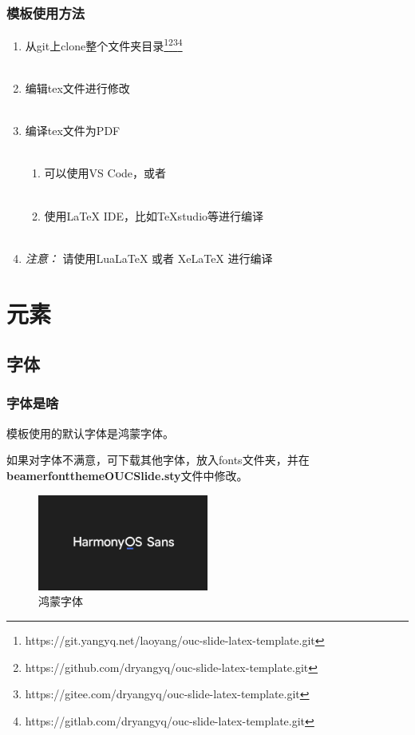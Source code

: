\documentclass[aspectratio=169,UTF8,t]{beamer}%
\begin{document}
\begin{frame}
    \frametitle{模板使用方法}    
    \begin{enumerate}
        \item 从git上clone整个文件夹目录\footnote{https://git.yangyq.net/laoyang/ouc-slide-latex-template.git }\footnote{https://github.com/dryangyq/ouc-slide-latex-template.git}\footnote{https://gitee.com/dryangyq/ouc-slide-latex-template.git}\footnote{https://gitlab.com/dryangyq/ouc-slide-latex-template.git}\\~
        \item 编辑tex文件进行修改\\~
        \item 编译tex文件为PDF\\~
        \begin{enumerate}
            \item 可以使用VS Code，或者\\~
            \item 使用LaTeX IDE，比如TeXstudio等进行编译\\~
        \end{enumerate}
        \item \emph{注意：} 请使用LuaLaTeX 或者 XeLaTeX 进行编译
    \end{enumerate}
\end{frame}

\section{元素}

\subsection{字体}

\begin{frame}
    \frametitle{字体是啥}
    模板使用的默认字体是鸿蒙字体。

    如果对字体不满意，可下载其他字体，放入fonts文件夹，并在\textbf{beamerfontthemeOUCSlide.sty}文件中修改。
    \begin{center}
        \begin{figure}
        \centering
        \includegraphics[width=0.5\textwidth]{figs/harmonysans.png}
            \caption{鸿蒙字体}
            \label{fig:harmonysans}
        \end{figure}
    \end{center}
\end{frame}
\end{document}
